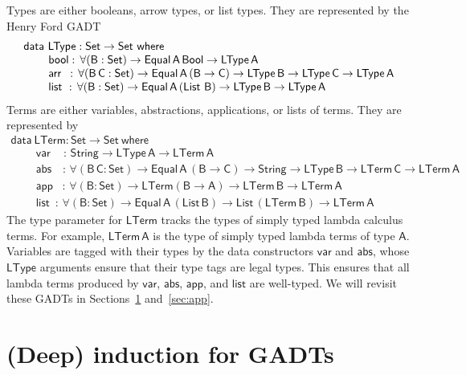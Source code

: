 \documentclass[9pt]{entcs}
\begin{document}
Types are either booleans, arrow types, or list types. They are
represented by the Henry Ford GADT
\begin{equation}\label{eq:eq_ltype}
\begin{array}{l}
\mathsf{data\ LType : Set \to Set\ where}\\
\mathsf{\;\;\;\;\;\;\;\;bool :\, \forall (B : Set) \to Equal\,A\,Bool
  \to LType\,A}\\ 
\mathsf{\;\;\;\;\;\;\;\;arr\,\,\, :\, \forall (B\,C : Set) \to
  Equal\,A\,(B \to C) \to LType\,B \to LType\,C \to LType\,A}\\ 
  \mathsf{\;\;\;\;\;\;\;\;list\,\, :\, \forall (B : Set) \to
    Equal\,A\,(\mathsf{List}\,\,B) \to LType\,B \to LType\,A} 
\end{array}
\end{equation}
Terms are either variables, abstractions, applications, or lists of
terms. They are represented by
\begin{equation}\label{eq:eq_lterm}
\begin{array}{l}
\mathsf{data\ LTerm : Set \to Set\ where}\\
\mathsf{\;\;\;\;\;\;\;\;var\,\,\,\,\,\,\,:\, String \to LType\,A \to
  LTerm\,A} \\  
\mathsf{\;\;\;\;\;\;\;\;abs\,\,\,\,\,\, :\, \forall (B\,C : Set) \to
  Equal\,A\,(B \to C) \to String \to LType\,B \to LTerm\,C \to
  LTerm\,A}\\ 
  \mathsf{\;\;\;\;\;\;\;\;app\,\,\,\,\, :\, \forall (B : Set) \to
    LTerm (B \to A) \to LTerm\,B \to LTerm\,A} \\ 
  \mathsf{\;\;\;\;\;\;\;\;list\,\,\, :\, \forall (B : Set) \to
    Equal\,A\,(List\,B) \to List\,(LTerm\,B) \to LTerm\,A} 
\end{array}
\end{equation}
The type parameter for $\mathsf{LTerm}$ tracks the types of simply
typed lambda calculus terms. For example, $\mathsf{LTerm\,A}$ is the
type of simply typed lambda terms of type $\mathsf{A}$. Variables are
tagged with their types by the data constructors $\mathsf{var}$ and
$\mathsf{abs}$, whose $\mathsf{LType}$ arguments ensure that their
type tags are legal types. This ensures that all lambda terms
produced by $\mathsf{var}$, $\mathsf{abs}$, $\mathsf{app}$, and
$\mathsf{list}$ are well-typed.  We will revisit these GADTs in
Sections~\ref{sec:deep-ind-GADTs} and~\ref{sec:app}.

\section{(Deep) induction for GADTs}\label{sec:deep-ind-GADTs}
\end{document}
